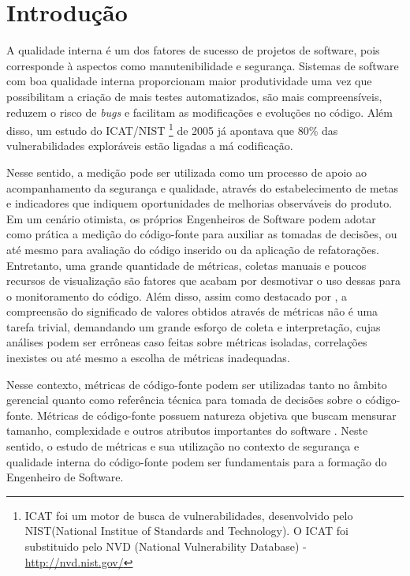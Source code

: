 \section{Introdução}
\label{introduction}

A qualidade interna é um dos fatores de sucesso de projetos de software, pois corresponde à aspectos como manutenibilidade e segurança. Sistemas de software com boa qualidade interna proporcionam maior produtividade uma vez que possibilitam a criação de mais testes automatizados, são mais compreensíveis, reduzem o risco de \emph{bugs} e facilitam as modificações e evoluções no código.
%
Além disso, um estudo do ICAT/NIST
%
\footnote{ICAT foi um motor de busca de vulnerabilidades, desenvolvido pelo NIST(National Institue of Standards and Technology). O ICAT foi substituido pelo NVD (National Vulnerability Database) - \url{http://nvd.nist.gov/}}
%
de 2005 já apontava que 80\% das vulnerabilidades exploráveis estão ligadas a má codificação.

Nesse sentido, a medição pode ser utilizada como um processo de apoio ao acompanhamento da segurança e qualidade, através do estabelecimento de metas e indicadores que indiquem oportunidades de melhorias observáveis do produto. Em um cenário otimista,
os próprios Engenheiros de Software podem adotar como prática a medição do código-fonte para auxiliar as tomadas de decisões, ou até mesmo para avaliação do código inserido ou da aplicação de refatorações. Entretanto, uma grande quantidade de métricas, coletas manuais e poucos recursos de visualização são fatores que acabam por desmotivar o uso dessas para o monitoramento do código. Além disso, assim como destacado por \cite{chidamber1994}, a compreensão do significado de valores obtidos através de métricas não é uma tarefa trivial, demandando um grande esforço de coleta e interpretação, cujas análises podem ser errôneas caso feitas sobre métricas isoladas, correlações inexistes ou até mesmo a escolha de métricas inadequadas.

Nesse contexto, métricas de código-fonte podem ser utilizadas tanto no âmbito gerencial quanto como referência técnica para tomada de decisões sobre o código-fonte. Métricas de código-fonte possuem natureza objetiva que buscam mensurar tamanho, complexidade e outros atributos importantes do software \cite{henry1984kafura}\cite{systa2000}. Neste sentido, o estudo de métricas e sua utilização no contexto de segurança e qualidade interna do código-fonte podem ser fundamentais para a formação do Engenheiro de Software.

